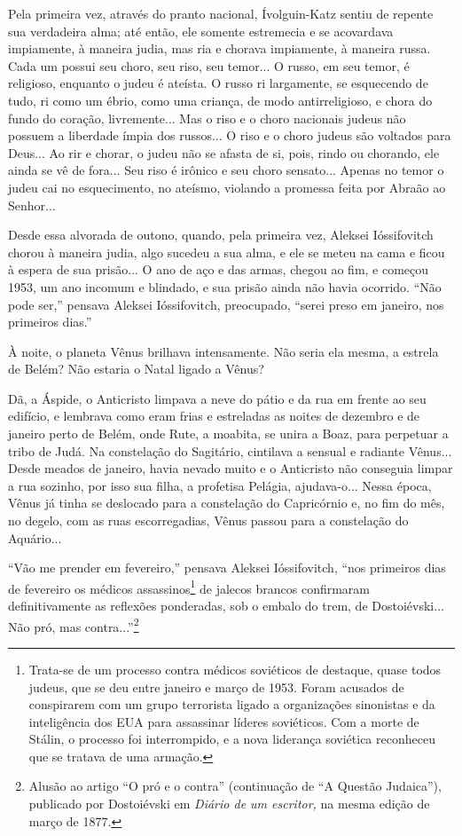 Pela primeira vez, através do pranto nacional, Ívolguin-Katz sentiu de
repente sua verdadeira alma; até então, ele somente estremecia e se
acovardava impiamente, à maneira judia, mas ria e chorava impiamente, à
maneira russa. Cada um possui seu choro, seu riso, seu temor... O russo,
em seu temor, é religioso, enquanto o judeu é ateísta. O russo ri
largamente, se esquecendo de tudo, ri como um ébrio, como uma criança,
de modo antirreligioso, e chora do fundo do coração, livremente... Mas o
riso e o choro nacionais judeus não possuem a liberdade ímpia dos
russos... O riso e o choro judeus são voltados para Deus... Ao rir e
chorar, o judeu não se afasta de si, pois, rindo ou chorando, ele ainda
se vê de fora... Seu riso é irônico e seu choro sensato... Apenas no
temor o judeu cai no esquecimento, no ateísmo, violando a promessa feita
por Abraão ao Senhor...

Desde essa alvorada de outono, quando, pela primeira vez, Aleksei
Ióssifovitch chorou à maneira judia, algo sucedeu a sua alma, e ele se
meteu na cama e ficou à espera de sua prisão... O ano de aço e das
armas, chegou ao fim, e começou 1953, um ano incomum e blindado, e sua
prisão ainda não havia ocorrido. ``Não pode ser,'' pensava Aleksei
Ióssifovitch, preocupado, ``serei preso em janeiro, nos primeiros
dias.''

À noite, o planeta Vênus brilhava intensamente. Não seria ela mesma, a
estrela de Belém? Não estaria o Natal ligado a Vênus?

Dã, a Áspide, o Anticristo limpava a neve do pátio e da rua em frente ao
seu edifício, e lembrava como eram frias e estreladas as noites de
dezembro e de janeiro perto de Belém, onde Rute, a moabita, se unira a
Boaz, para perpetuar a tribo de Judá. Na constelação do Sagitário,
cintilava a sensual e radiante Vênus... Desde meados de janeiro, havia
nevado muito e o Anticristo não conseguia limpar a rua sozinho, por isso
sua filha, a profetisa Pelágia, ajudava-o... Nessa época, Vênus já tinha
se deslocado para a constelação do Capricórnio e, no fim do mês, no
degelo, com as ruas escorregadias, Vênus passou para a constelação do
Aquário...

``Vão me prender em fevereiro,'' pensava Aleksei Ióssifovitch, ``nos
primeiros dias de fevereiro os médicos assassinos\footnote{Trata-se de
  um processo contra médicos soviéticos de destaque, quase todos judeus,
  que se deu entre janeiro e março de 1953. Foram acusados de
  conspirarem com um grupo terrorista ligado a organizações sinonistas e
  da inteligência dos EUA para assassinar líderes soviéticos. Com a
  morte de Stálin, o processo foi interrompido, e a nova liderança
  soviética reconheceu que se tratava de uma armação.} de jalecos
brancos confirmaram definitivamente as reflexões ponderadas, sob o
embalo do trem, de Dostoiévski... Não pró, mas contra...''\footnote{Alusão
  ao artigo ``O pró e o contra'' (continuação de ``A Questão Judaica''),
  publicado por Dostoiévski em \emph{Diário de um escritor,} na mesma
  edição de março de 1877.}

